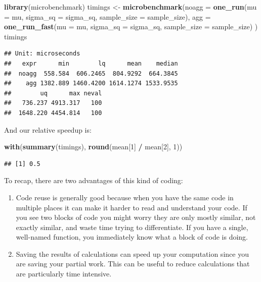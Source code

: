 \documentclass[
]{book}
\newenvironment{Shaded}{\begin{snugshade}}{\end{snugshade}}
\newcommand{\AttributeTok}[1]{\textcolor[rgb]{0.13,0.29,0.53}{#1}}
\newcommand{\DecValTok}[1]{\textcolor[rgb]{0.00,0.00,0.81}{#1}}
\newcommand{\FunctionTok}[1]{\textcolor[rgb]{0.13,0.29,0.53}{\textbf{#1}}}
\newcommand{\NormalTok}[1]{#1}
\newcommand{\OtherTok}[1]{\textcolor[rgb]{0.56,0.35,0.01}{#1}}
\newcommand{\SpecialCharTok}[1]{\textcolor[rgb]{0.81,0.36,0.00}{\textbf{#1}}}
\begin{document}
\begin{Shaded}
\begin{Highlighting}[]
\FunctionTok{library}\NormalTok{(microbenchmark)}
\NormalTok{timings }\OtherTok{\textless{}{-}} \FunctionTok{microbenchmark}\NormalTok{(}\AttributeTok{noagg =} \FunctionTok{one\_run}\NormalTok{(}\AttributeTok{mu =}\NormalTok{ mu, }\AttributeTok{sigma\_sq =}\NormalTok{ sigma\_sq, }
                                          \AttributeTok{sample\_size =}\NormalTok{ sample\_size),}
                          \AttributeTok{agg =} \FunctionTok{one\_run\_fast}\NormalTok{(}\AttributeTok{mu =}\NormalTok{ mu, }\AttributeTok{sigma\_sq =}\NormalTok{ sigma\_sq, }
                                             \AttributeTok{sample\_size =}\NormalTok{ sample\_size) )}
\NormalTok{timings}
\end{Highlighting}
\end{Shaded}

\begin{verbatim}
## Unit: microseconds
##   expr      min        lq      mean    median
##  noagg  558.584  606.2465  804.9292  664.3845
##    agg 1382.889 1460.4200 1614.1274 1533.9535
##        uq      max neval
##   736.237 4913.317   100
##  1648.220 4454.814   100
\end{verbatim}

And our relative speedup is:

\begin{Shaded}
\begin{Highlighting}[]
\FunctionTok{with}\NormalTok{(}\FunctionTok{summary}\NormalTok{(timings), }\FunctionTok{round}\NormalTok{(mean[}\DecValTok{1}\NormalTok{] }\SpecialCharTok{/}\NormalTok{ mean[}\DecValTok{2}\NormalTok{], }\DecValTok{1}\NormalTok{))}
\end{Highlighting}
\end{Shaded}

\begin{verbatim}
## [1] 0.5
\end{verbatim}

To recap, there are two advantages of this kind of coding:

\begin{enumerate}
\def\labelenumi{\arabic{enumi}.}
\item
  Code reuse is generally good because when you have the same code in multiple places it can make it harder to read and understand your code. If you see two blocks of code you might worry they are only mostly similar, not exactly similar, and waste time trying to differentiate. If you have a single, well-named function, you immediately know what a block of code is doing.
\item
  Saving the results of calculations can speed up your computation since you are saving your partial work. This can be useful to reduce calculations that are particularly time intensive.
\end{enumerate}
\end{document}
